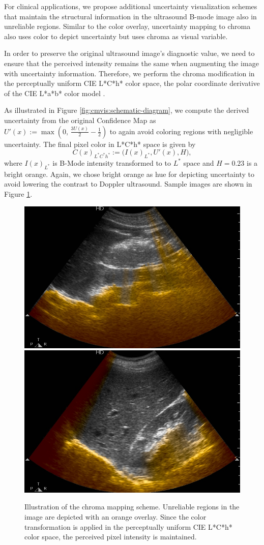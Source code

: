For clinical applications, we propose additional uncertainty visualization schemes that maintain the structural information in the ultrasound B-mode image also in unreliable regions.
Similar to the color overlay, uncertainty mapping to chroma also uses color to depict uncertainty but uses chroma as visual variable.

In order to preserve the original ultrasound image's diagnostic value, we need to ensure that the perceived intensity remains the same when augmenting the image with uncertainty information.
Therefore, we perform the chroma modification in the perceptually uniform CIE L*C*h* color space, the polar coordinate derivative of the CIE L*a*b* color model \cite{Plataniotis:2000:ColorImageProcessing}.

As illustrated in Figure \ref{fig:cmvis:schematic-diagram}, we compute the derived uncertainty from the original Confidence Map as $U'(x) := \max \left( 0, \, \frac{3 U(x)}{2} - \frac12 \right)$ to again avoid coloring regions with negligible uncertainty.
The final pixel color in L*C*h* space is given by
\begin{equation}
	C(x)_{L^*C^*h^*} := \big( I(x)_{L^*}, U'(x), H \big),
\end{equation}
where $I(x)_{L^*}$ is B-Mode intensity transformed to to $L^*$ space and $H = 0.23$ is a bright orange.
Again, we chose bright orange as hue for depicting uncertainty to avoid lowering the contrast to Doppler ultrasound.
Sample images are shown in Figure \ref{fig:cmvis:vis-chroma}.

\begin{figure}[ht]
	\centering
	\includegraphics[width=0.42\linewidth]{figures/cmvis/chroma-100.jpg}
	\qquad
	\includegraphics[width=0.42\linewidth]{figures/cmvis/chroma-300.jpg}
	\caption{
		Illustration of the chroma mapping scheme.
		Unreliable regions in the image are depicted with an orange overlay.
		Since the color transformation is applied in the perceptually uniform CIE L*C*h* color space, the perceived pixel intensity is maintained.
	}
	\label{fig:cmvis:vis-chroma}
\end{figure}


